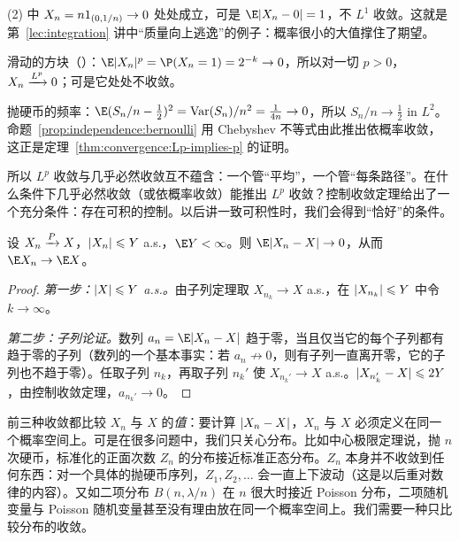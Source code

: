 \begin{example}[几乎必然收敛但不 $L^1$ 收敛]\label{ex:convergence:as-not-L1}
(2) 中 $X_n=n1_{(0,1/n)}\to0$ 处处成立，可是 $\E\abs{X_n-0}=1$，不 $L^1$ 收敛。这就是第~\ref{lec:integration} 讲中“质量向上逃逸”的例子：概率很小的大值撑住了期望。
\end{example}

\begin{example}[$L^p$ 收敛但不几乎必然收敛]\label{ex:convergence:Lp-not-as}
滑动的方块（）：$\E\abs{X_n}^p=\P(X_n=1)=2^{-k}\to0$，所以对一切 $p>0$，$X_n\xrightarrow{L^{p}}0$；可是它处处不收敛。
\end{example}

\begin{example}[均方收敛与弱大数定律]
抛硬币的频率：$\E(S_n/n-\frac12)^2=\Var(S_n)/n^2=\frac1{4n}\to0$，所以 $S_n/n\to\frac12$ in $L^2$。命题~\ref{prop:independence:bernoulli} 用 Chebyshev 不等式由此推出依概率收敛，这正是定理~\ref{thm:convergence:Lp-implies-p} 的证明。
\end{example}

所以 $L^p$ 收敛与几乎必然收敛互不蕴含：一个管“平均”，一个管“每条路径”。在什么条件下几乎必然收敛（或依概率收敛）能推出 $L^p$ 收敛？控制收敛定理给出了一个充分条件：存在可积的控制。以后讲一致可积性时，我们会得到“恰好”的条件。

\begin{proposition}[控制收敛定理的依概率版本]\label{prop:convergence:dct-probability}
设 $X_n\xrightarrow{P} X$，$\lvert X_n\rvert\leqslant Y$ a.s.，$\E Y<\infty$。则 $\E\abs{X_n-X}\to0$，从而 $\E X_n\to \E X$。
\end{proposition}
\begin{proof}
\emph{第一步：$\lvert X\rvert\leqslant Y$ a.s.。}由子列定理取 $X_{n_k}\to X$ a.s.，在 $\lvert X_{n_k}\rvert\leqslant Y$ 中令 $k\to\infty$。

\emph{第二步：子列论证。}数列 $a_n=\E\abs{X_n-X}$ 趋于零，当且仅当它的每个子列都有趋于零的子列（数列的一个基本事实：若 $a_n\not\to0$，则有子列一直离开零，它的子列也不趋于零）。任取子列 $n_k$，再取子列 $n_k'$ 使 $X_{n_k'}\to X$ a.s.。$\lvert X_{n_k'}-X\rvert\leqslant2Y$，由控制收敛定理，$a_{n_k'}\to0$。
\end{proof}


前三种收敛都比较 $X_n$ 与 $X$ 的\emph{值}：要计算 $\lvert X_n-X\rvert$，$X_n$ 与 $X$ 必须定义在同一个概率空间上。可是在很多问题中，我们只关心分布。比如中心极限定理说，抛 $n$ 次硬币，标准化的正面次数 $Z_n$ 的分布接近标准正态分布。$Z_n$ 本身并不收敛到任何东西：对一个具体的抛硬币序列，$Z_1,Z_2,\dots$ 会一直上下波动（这是以后重对数律的内容）。又如二项分布 $B(n,\lambda/n)$ 在 $n$ 很大时接近 Poisson 分布，二项随机变量与 Poisson 随机变量甚至没有理由放在同一个概率空间上。我们需要一种只比较分布的收敛。

